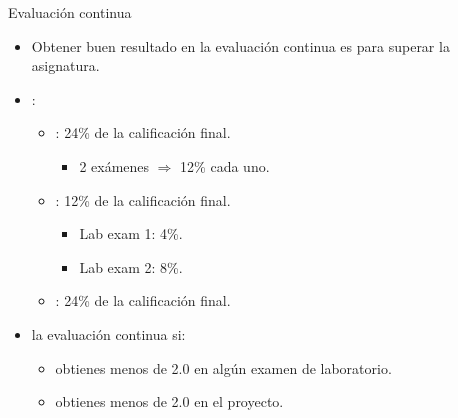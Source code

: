\begin{frame}[t]{Evaluación continua}
\begin{itemize}
  \item Obtener buen resultado en la evaluación continua es  para superar 
        la asignatura.
  
  \item {}:
    \begin{itemize}
      \item {}: 24\% de la calificación final.
        \begin{itemize}
          \item 2 exámenes $\Rightarrow$ 12\% cada uno.
        \end{itemize}
      \item {}: 12\% de la calificación final.
        \begin{itemize}
          \item Lab exam 1: 4\%.
          \item Lab exam 2: 8\%.
        \end{itemize}
      \item {}: 24\% de la calificación final.
    \end{itemize}
  
  \item {} la evaluación continua si:
    \begin{itemize}
      \item obtienes menos de 2.0 en algún examen de laboratorio.
      \item obtienes menos de 2.0 en el proyecto.
    \end{itemize}
\end{itemize}
\end{frame}

